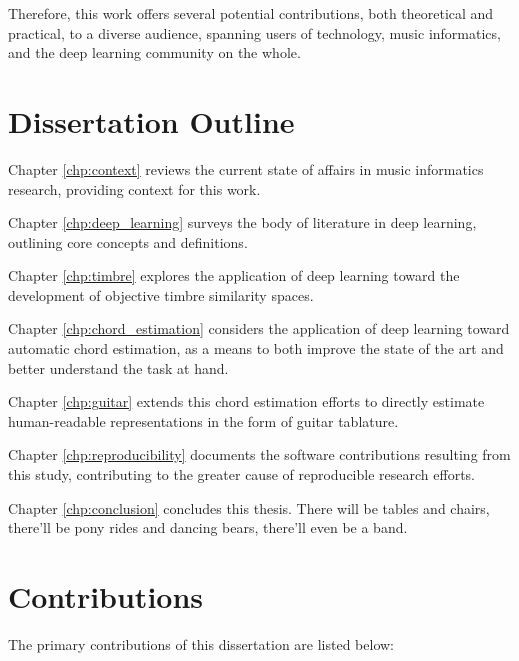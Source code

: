 Therefore, this work offers several potential contributions, both theoretical and practical, to a diverse audience, spanning users of technology, music informatics, and the deep learning community on the whole.


\section{Dissertation Outline}
\label{sec:outline}
\begin{description}

\item Chapter \ref{chp:context} reviews the current state of affairs in music informatics research, providing context for this work.

\item Chapter \ref{chp:deep_learning} surveys the body of literature in deep learning, outlining core concepts and definitions.

\item Chapter \ref{chp:timbre} explores the application of deep learning toward the development of objective timbre similarity spaces.

\item Chapter \ref{chp:chord_estimation} considers the application of deep learning toward automatic chord estimation, as a means to both improve the state of the art and better understand the task at hand.

\item Chapter \ref{chp:guitar} extends this chord estimation efforts to directly estimate human-readable representations in the form of guitar tablature.

\item Chapter \ref{chp:reproducibility} documents the software contributions resulting from this study, contributing to the greater cause of reproducible research efforts.

\item Chapter \ref{chp:conclusion} concludes this thesis.
There will be tables and chairs, there'll be pony rides and dancing bears, there'll even be a band.

\end{description}

\section{Contributions}
The primary contributions of this dissertation are listed below:

